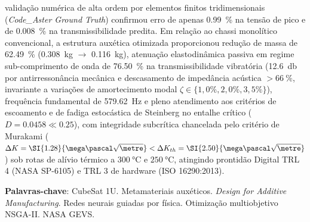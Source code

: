 \begin{resumo}
validação numérica de alta ordem por elementos finitos tridimensionais (\textit{Code\_Aster Ground Truth}) confirmou erro de apenas \SI{0.99}{\percent} na tensão de pico e de \SI{0.008}{\percent} na transmissibilidade predita. Em relação ao chassi monolítico convencional, a estrutura auxética otimizada proporcionou redução de massa de \SI{62.49}{\percent} (\SI{0.308}{\kilo\gram} $\to$ \SI{0.116}{\kilo\gram}), atenuação elastodinâmica passiva em regime sub-comprimento de onda de \SI{76.50}{\percent} na transmissibilidade vibratória (\SI{12.6}{\decibel} por antirressonância mecânica e descasamento de impedância acústica $> \SI{66}{\percent}$, invariante a variações de amortecimento modal $\zeta \in \{1{,}0\%, 2{,}0\%, 3{,}5\%\}$), frequência fundamental de \SI{579.62}{\hertz} e pleno atendimento aos critérios de escoamento e de fadiga estocástica de Steinberg no entalhe crítico ($D = \num{0.0458} \ll \num{0.25}$), com integridade subcrítica chancelada pelo critério de Murakami ($\Delta K = \SI{1.28}{\mega\pascal\sqrt{\metre}} < \Delta K_{th} = \SI{2.50}{\mega\pascal\sqrt{\metre}}$) sob rotas de alívio térmico a $\SI{300}{\celsius}$ e $\SI{250}{\celsius}$, atingindo prontidão Digital TRL 4 (NASA SP-6105) e TRL 3 de hardware (ISO 16290:2013).

\vspace{\onelineskip}
\noindent
\textbf{Palavras-chave}: CubeSat 1U. Metamateriais auxéticos. \textit{Design for Additive Manufacturing}. Redes neurais guiadas por física. Otimização multiobjetivo NSGA-II. NASA GEVS.
\end{resumo}
